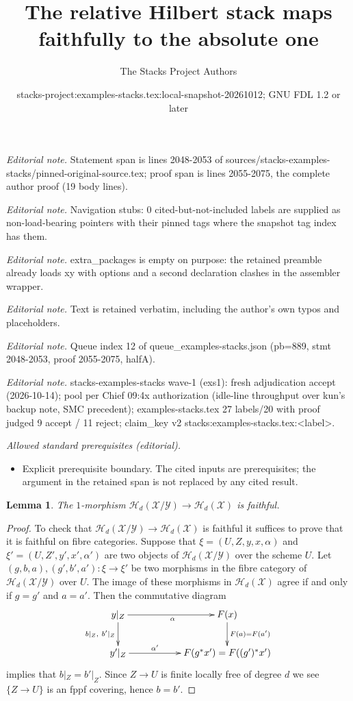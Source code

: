 \documentclass[10pt,a4paper]{amsart}
\title{The relative Hilbert stack maps faithfully to the absolute one}
\author{The Stacks Project Authors}
\date{stacks-project:examples-stacks.tex:local-snapshot-20261012; GNU FDL 1.2 or later}
\theoremstyle{plain}
\newtheorem{lemma}[subsection]{Lemma}
\theoremstyle{definition}
\theoremstyle{remark}
\numberwithin{equation}{subsection}
\begin{document}
\maketitle
\noindent\textit{Editorial note.} Statement span is lines 2048-2053 of sources/stacks-examples-stacks/pinned-original-source.tex; proof span is lines 2055-2075, the complete author proof (19 body lines).\par\medskip
\noindent\textit{Editorial note.} Navigation stubs: 0 cited-but-not-included labels are supplied as non-load-bearing pointers with their pinned tags where the snapshot tag index has them.\par\medskip
\noindent\textit{Editorial note.} extra\_packages is empty on purpose: the retained preamble already loads xy with options and a second declaration clashes in the assembler wrapper.\par\medskip
\noindent\textit{Editorial note.} Text is retained verbatim, including the author's own typos and placeholders.\par\medskip
\noindent\textit{Editorial note.} Queue index 12 of queue\_examples-stacks.json (pb=889, stmt 2048-2053, proof 2055-2075, halfA).\par\medskip
\noindent\textit{Editorial note.} stacks-examples-stacks wave-1 (exs1): fresh adjudication accept (2026-10-14); pool per Chief 09:4x authorization (idle-line throughput over kun's backup note, SMC precedent); examples-stacks.tex 27 labels/20 with proof judged 9 accept / 11 reject; claim\_key v2 stacks:examples-stacks.tex:<label>.\par\medskip
\noindent\textit{Allowed standard prerequisites (editorial).}\begin{itemize}
\item Explicit prerequisite boundary. The cited inputs are prerequisites; the argument in the retained span is not replaced by any cited result.
\end{itemize}\medskip
\begin{lemma}
\label{lemma-faithful-hilbert}
The $1$-morphism
$\mathcal{H}_d(\mathcal{X}/\mathcal{Y}) \to \mathcal{H}_d(\mathcal{X})$
is faithful.
\end{lemma}

\begin{proof}
To check that
$\mathcal{H}_d(\mathcal{X}/\mathcal{Y}) \to \mathcal{H}_d(\mathcal{X})$
is faithful it suffices to prove that it is faithful on fibre categories.
Suppose that $\xi = (U, Z, y, x, \alpha)$ and $\xi' = (U, Z', y', x', \alpha')$
are two objects of $\mathcal{H}_d(\mathcal{X}/\mathcal{Y})$ over the
scheme $U$. Let $(g, b, a), (g', b', a') : \xi \to \xi'$ be two morphisms
in the fibre category of $\mathcal{H}_d(\mathcal{X}/\mathcal{Y})$ over $U$.
The image of these morphisms in $\mathcal{H}_d(\mathcal{X})$ agree
if and only if $g = g'$ and $a = a'$. Then the commutative diagram
$$
\xymatrix{
y|_Z \ar[rr]_\alpha \ar[d]_{b|_Z, \ b'|_Z} & &
F(x) \ar[d]^{F(a) = F(a')} \\
y'|_Z \ar[rr]^-{\alpha'} & &
F(g^*x') = F((g')^*x') \\
}
$$
implies that $b|_Z = b'|_Z$. Since $Z \to U$ is finite locally free of degree
$d$ we see $\{Z \to U\}$ is an fppf covering, hence $b = b'$.
\end{proof}
\end{document}
